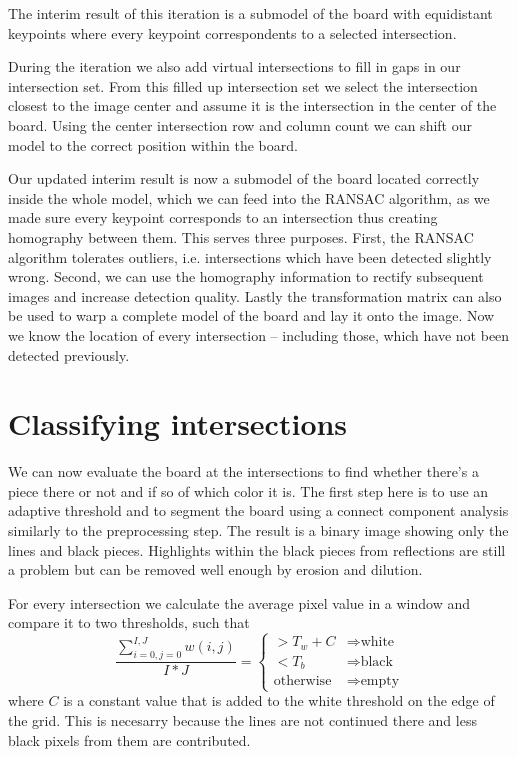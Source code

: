 	The interim result of this iteration is a submodel of the board with equidistant keypoints where every keypoint correspondents to a selected intersection.

	During the iteration we also add virtual intersections to fill in gaps in our intersection set. From this filled up intersection set we select the intersection closest to the image center and assume it is the intersection in the center of the board. Using the center intersection row and column count we can shift our model to the correct position within the board.

	Our updated interim result is now a submodel of the board located correctly inside the whole model, which we can feed into the RANSAC algorithm, as we made sure every keypoint corresponds to an intersection thus creating homography between them. This serves three purposes. First, the RANSAC algorithm tolerates outliers, i.e. intersections which have been detected slightly wrong. Second, we can use the homography information to rectify subsequent images and increase detection quality. Lastly the transformation matrix can also be used to warp a complete model of the board and lay it onto the image. Now we know the location of every intersection -- including those, which have not been detected previously.

	\section{Classifying intersections}
	\label{detector-classifying}
	We can now evaluate the board at the intersections to find whether there's a piece there or not and if so of which color it is. The first step here is to use an adaptive threshold and to segment the board using a connect component analysis similarly to the preprocessing step. The result is a binary image showing only the lines and black pieces. Highlights within the black pieces from reflections are still a problem but can be removed well enough by erosion and dilution.

	For every intersection we calculate the average pixel value in a window and compare it to two thresholds, such that \begin{equation}
		\frac{\sum^{I,J}_{i=0,j=0}w(i,j)}{I*J} =
		\begin{cases}
		> T_{w} + C & \Rightarrow  \text{white}\\
		< T_{b} & \Rightarrow \text{black}\\
		\text{otherwise} & \Rightarrow \text{empty}
		\end{cases}
	\end{equation}
	where $C$ is a constant value that is added to the white threshold on the edge of the grid. This is necesarry because the lines are not continued there and less black pixels from them are contributed.
